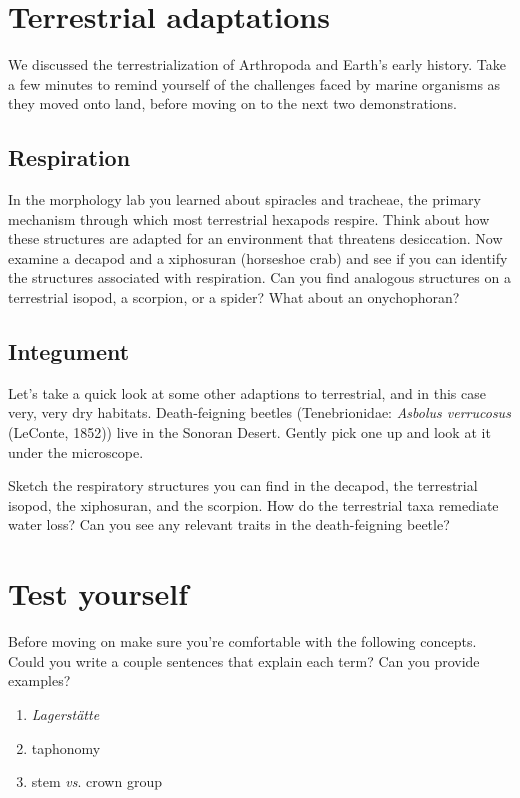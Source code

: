 \section{Terrestrial adaptations}
We discussed the terrestrialization of Arthropoda and Earth's early history. Take a few minutes to remind yourself of the challenges faced by marine organisms as they moved onto land, before moving on to the next two demonstrations.

\subsection{Respiration}
In the morphology lab you learned about spiracles and tracheae, the primary mechanism through which most terrestrial hexapods respire. Think about how these structures are adapted for an environment that threatens desiccation. Now examine a decapod and a xiphosuran (horseshoe crab) and see if you can identify the structures associated with respiration. Can you find analogous structures on a terrestrial isopod, a scorpion, or a spider? What about an onychophoran?

\subsection{Integument}
Let's take a quick look at some other adaptions to terrestrial, and in this case very, very dry habitats. Death-feigning beetles (Tenebrionidae: \textit{Asbolus verrucosus} (LeConte, 1852)) live in the Sonoran Desert. Gently pick one up and look at it under the microscope.

\begin{theo}
{}Sketch the respiratory structures you can find in the decapod, the terrestrial isopod, the xiphosuran, and the scorpion. How do the terrestrial taxa remediate water loss? Can you see any relevant traits in the death-feigning beetle?\end{theo}

\section*{Test yourself}
Before moving on make sure you're comfortable with the following concepts. Could you write a couple sentences that explain each term? Can you provide examples?

\begin{enumerate} 
\item{\textit{Lagerst{\"a}tte}} 
\item{taphonomy}  
\item {stem \textit{vs}. crown group}
\end{enumerate}

